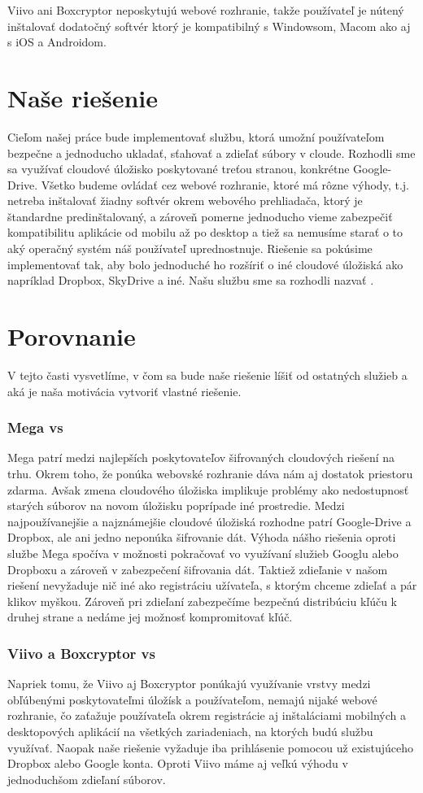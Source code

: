 		Viivo ani Boxcryptor neposkytujú webové rozhranie, takže používateľ je nútený inštalovať dodatočný softvér ktorý je kompatibilný s Windowsom, Macom ako aj s iOS a Androidom.

\section{Naše riešenie}
	Cieľom našej práce bude implementovať službu, ktorá umožní používateľom bezpečne a jednoducho ukladať, sťahovať a zdieľať súbory v cloude. Rozhodli sme sa využívať cloudové úložisko poskytované treťou stranou, konkrétne Google-Drive. Všetko budeme ovládať cez webové rozhranie, ktoré má rôzne výhody, t.j. netreba inštalovať žiadny softvér okrem webového prehliadača, ktorý je štandardne predinštalovaný, a zároveň pomerne jednoducho vieme zabezpečiť kompatibilitu aplikácie od mobilu až po desktop a tiež sa nemusíme starať o to aký operačný systém náš používateľ uprednostnuje. Riešenie sa pokúsime implementovať tak, aby bolo jednoduché ho rozšíriť o iné cloudové úložiská ako napríklad Dropbox, SkyDrive a iné. Našu službu sme sa rozhodli nazvať \serviceName.

\section{Porovnanie}
	V tejto časti vysvetlíme, v čom sa bude naše riešenie líšiť od ostatných služieb a aká je naša motivácia vytvoriť vlastné riešenie.
	\subsubsection{Mega vs \serviceName}
	Mega patrí medzi najlepších poskytovateľov šifrovaných cloudových riešení na trhu. Okrem toho, že ponúka webovské rozhranie dáva nám aj dostatok priestoru zdarma. Avšak zmena cloudového úložiska implikuje problémy ako nedostupnosť starých súborov na novom úložisku poprípade iné prostredie. Medzi najpoužívanejšie a najznámejšie cloudové úložiská rozhodne patrí Google-Drive a Dropbox, ale ani jedno neponúka šifrovanie dát. Výhoda nášho riešenia oproti službe Mega spočíva v možnosti pokračovať vo využívaní služieb Googlu alebo Dropboxu a zároveň v zabezpečení šifrovania dát. Taktiež zdieľanie v našom riešení nevyžaduje nič iné ako registráciu užívateľa, s ktorým chceme zdieľať a pár klikov myškou. Zároveň pri zdieľaní zabezpečíme bezpečnú distribúciu kľúču k druhej strane a nedáme jej možnosť kompromitovať kľúč.
	
	\subsubsection{Viivo a Boxcryptor vs \serviceName}
	Napriek tomu, že Viivo aj Boxcryptor ponúkajú využívanie vrstvy medzi obľúbenými poskytovateľmi úložísk a používateľom, nemajú nijaké webové rozhranie, čo zaťažuje používateľa okrem registrácie aj inštaláciami mobilných a desktopových aplikácií na všetkých zariadeniach, na ktorých budú službu využívať. Naopak naše riešenie vyžaduje iba prihlásenie pomocou už existujúceho Dropbox alebo Google konta. Oproti Viivo máme aj veľkú výhodu v jednoduchšom zdieľaní súborov.